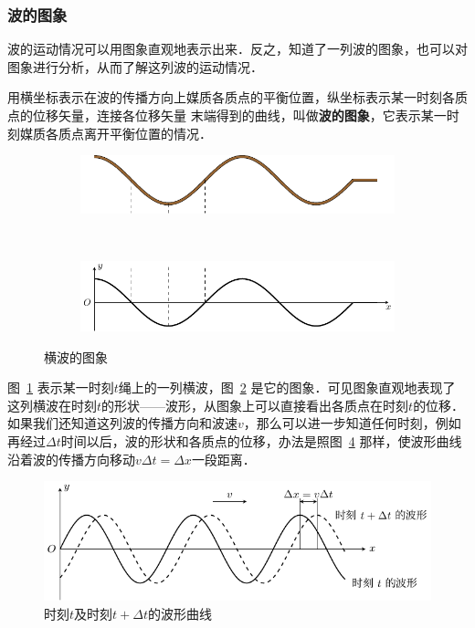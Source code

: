 \subsubsection{波的图象}

波的运动情况可以用图象直观地表示出来．反之，知道了一列波的图象，也可以对图象进行分析，从而了解这列波的运动情况．

用横坐标表示在波的传播方向上媒质各质点的平衡位置，纵坐标表示某一时刻各质点的位移矢量，连接各位移矢量
末端得到的曲线，叫做\textbf{波的图象}，它表示某一时刻媒质各质点离开平衡位置的情况．
\begin{figure}[htbp]
    \centering
    \begin{subfigure}{0.8\linewidth}
        \centering
        \includegraphics{fig/A/9-17a.pdf}
        \caption{}\label{fig_A_9-17a}
    \end{subfigure}
    \\
    \begin{subfigure}{0.8\linewidth}
        \centering
        \includegraphics{fig/A/9-17b.pdf}
        \caption{}\label{fig_A_9-17b}
    \end{subfigure}
    \caption{横波的图象}\label{fig_A_9-17}
\end{figure}


图~\ref{fig_A_9-17a} 表示某一时刻$t$绳上的一列横波，图~\ref{fig_A_9-17b} 是它的图象．可见图象直观地表现了这列横波在时刻$t$的形状——波形，从图象上可以直接看出各质点在时刻$t$的位移．
如果我们还知道这列波的传播方向和波速$v$，那么可以进一步知道任何时刻，例如再经过$\Delta t$时间以后，波的形状和各质点的位移，办法是照图~\ref{fig_A_9-18} 那样，使波形曲线沿着波的传播方向移动$v\Delta t=\Delta x$一段距离．
\begin{figure}[htbp]
	\centering
	\includegraphics{fig/A/9-18.pdf}
	\caption{时刻$t$及时刻$t+\Delta t$的波形曲线}\label{fig_A_9-18}
\end{figure}


